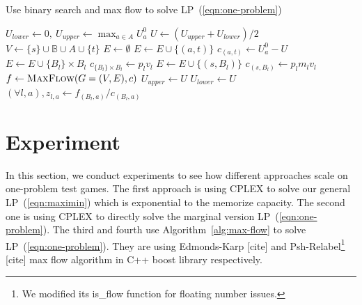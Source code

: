 \documentclass{article}
\begin{document}
\begin{algorithm}
\caption{Use binary search and max flow to solve LP~(\ref{eqn:one-problem})}
\label{alg:max-flow}
\begin{algorithmic}[1]
	\State $U_{lower} \gets 0, ~U_{upper} \gets \max_{a \in A} U^0_a$
		\State $U \gets (U_{upper}+U_{lower})/2$ 
		\State $V \gets \{s\} \cup \mathbb B \cup A \cup \{t\}$ 
		\State $E \gets \emptyset$ 
				\State $E \gets E \cup \{(a, t)\}$
				\State $c_{(a, t)} \gets U^0_a-U$ 
			\EndIf
		\EndFor
			\State $E \gets E \cup \{B_l\} \times B_l$ %
			\State $c_{\{B_l\} \times B_l} \gets p_l v_l$ 
			\State $E \gets E \cup \{(s, B_l)\}$ %
			\State $c_{(s, B_l)} \gets p_l m_l v_l$
		\EndFor
		\State $f \gets \Call{MaxFlow}{G = (V, E), c}$
			\State $U_{upper} \gets U$
		\Else
			\State $U_{lower} \gets U$
		\EndIf
	\EndWhile
	\State $(\forall l, a), z_{l,a} \gets f_{(B_l,a)} / c_{(B_l, a)}$
	\State {}
\end{algorithmic}
\end{algorithm}

\section{Experiment}

In this section, we conduct experiments to see how different approaches scale
on one-problem test games. The first approach is using CPLEX to solve our
general LP~(\ref{eqn:maximin}) which is exponential to the memorize capacity.
The second one is using CPLEX to directly solve the marginal version
LP~(\ref{eqn:one-problem}).  The third and fourth use
Algorithm~\ref{alg:max-flow} to solve LP~(\ref{eqn:one-problem}). They are
using Edmonds-Karp [cite] and Psh-Relabel\footnote{We modified its is\_flow
function for floating number issues.} [cite] max flow algorithm in C++ boost
library respectively.

\end{document}
